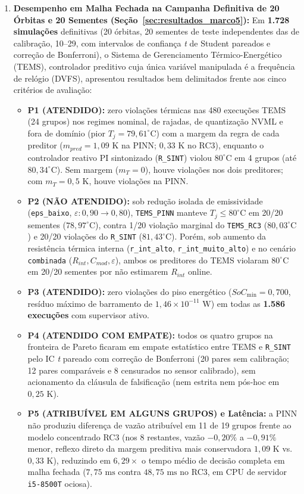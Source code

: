 \begin{enumerate}[label=\textbf{\arabic*.},leftmargin=*]
    \item \textbf{Desempenho em Malha Fechada na Campanha Definitiva de 20 Órbitas e 20 Sementes (Seção~\ref{sec:resultados_marco5}):} Em \textbf{1.728 simulações} definitivas (20 órbitas, 20 sementes de teste independentes das de calibração, 10–29, com intervalos de confiança \textit{t} de Student pareados e correção de Bonferroni), o Sistema de Gerenciamento Térmico-Energético (TEMS), controlador preditivo cuja única variável manipulada é a frequência de relógio (DVFS), apresentou resultados bem delimitados frente aos cinco critérios de avaliação:
    \begin{itemize}
        \item \textbf{P1 (ATENDIDO):} zero violações térmicas nas 480 execuções TEMS (24 grupos) nos regimes nominal, de rajadas, de quantização NVML e fora de domínio (pior $T_j = 79{,}61^\circ\text{C}$) com a margem da regra de cada preditor ($m_{pred} = 1{,}09\text{ K}$ na PINN; $0{,}33\text{ K}$ no RC3), enquanto o controlador reativo PI sintonizado (\texttt{R\_SINT}) violou $80^\circ\text{C}$ em 4 grupos (até $80{,}34^\circ\text{C}$). Sem margem ($m_T = 0$), houve violações nos dois preditores; com $m_T = 0{,}5\text{ K}$, houve violações na PINN.
        \item \textbf{P2 (NÃO ATENDIDO):} sob redução isolada de emissividade (\texttt{eps\_baixo}, $\varepsilon: 0{,}90 \to 0{,}80$), \texttt{TEMS\_PINN} manteve $T_j \le 80^\circ\text{C}$ em 20/20 sementes ($78{,}97^\circ\text{C}$), contra 1/20 violação marginal do \texttt{TEMS\_RC3} ($80{,}03^\circ\text{C}$) e 20/20 violações do \texttt{R\_SINT} ($81{,}43^\circ\text{C}$). Porém, sob aumento da resistência térmica interna (\texttt{r\_int\_alto}, \texttt{r\_int\_muito\_alto}) e no cenário \texttt{combinada} ($R_{int}, C_{mod}, \varepsilon$), ambos os preditores do TEMS violaram $80^\circ\text{C}$ em 20/20 sementes por não estimarem $R_{int}$ online.
        \item \textbf{P3 (ATENDIDO):} zero violações do piso energético ($SoC_{\min} = 0{,}700$, resíduo máximo de barramento de $1{,}46 \times 10^{-11}\text{ W}$) em todas as \textbf{1.586 execuções} com supervisor ativo.
        \item \textbf{P4 (ATENDIDO COM EMPATE):} todos os quatro grupos na fronteira de Pareto ficaram em empate estatístico entre TEMS e \texttt{R\_SINT} pelo IC \textit{t} pareado com correção de Bonferroni (20 pares sem calibração; 12 pares comparáveis e 8 censurados no sensor calibrado), sem acionamento da cláusula de falsificação (nem estrita nem pós-hoc em $0{,}25\text{ K}$).
        \item \textbf{P5 (ATRIBUÍVEL EM ALGUNS GRUPOS) e Latência:} a PINN não produziu diferença de vazão atribuível em 11 de 19 grupos frente ao modelo concentrado RC3 (nos 8 restantes, vazão $-0{,}20\%$ a $-0{,}91\%$ menor, reflexo direto da margem preditiva mais conservadora $1{,}09\text{ K}$ vs. $0{,}33\text{ K}$), reduzindo em \textbf{$6{,}29\times$} o tempo médio de decisão completa em malha fechada ($7{,}75\text{ ms}$ contra $48{,}75\text{ ms}$ no RC3, em CPU de servidor \texttt{i5-8500T} ociosa).
    \end{itemize}


\end{enumerate}
